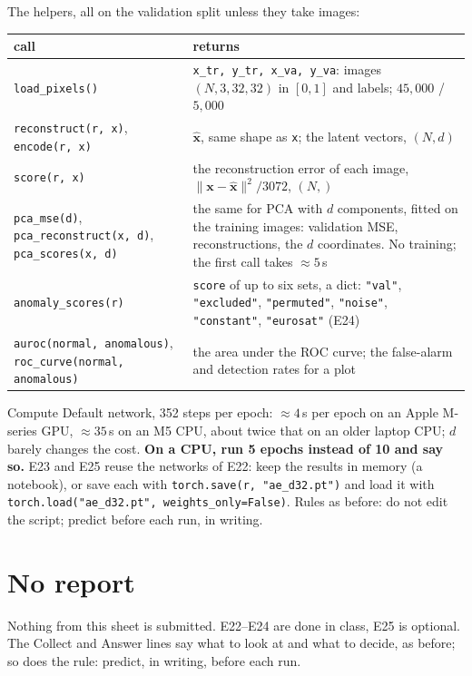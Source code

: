 \documentclass[11pt]{article}
\newcommand{\code}[1]{\texttt{#1}}
\begin{document}
The helpers, all on the validation split unless they take images:
\begin{center}\small
\begin{tabular}{@{}L{5.6cm}L{10.6cm}@{}}
\toprule
call & returns \\
\midrule
\code{load\_pixels()} & \code{x\_tr, y\_tr, x\_va, y\_va}: images $(N,3,32,32)$ in $[0,1]$ and labels; $45{,}000$ / $5{,}000$ \\
\code{reconstruct(r, x)}, \code{encode(r, x)} & $\hat{\mathbf x}$, same shape as \code{x}; the latent vectors, $(N,d)$ \\
\code{score(r, x)} & the reconstruction error of each image, $\|\mathbf x-\hat{\mathbf x}\|^2/3072$, $(N,)$ \\
\code{pca\_mse(d)}, \code{pca\_reconstruct(x, d)}, \code{pca\_scores(x, d)} & the same for PCA with $d$ components, fitted on the training images: validation MSE, reconstructions, the $d$ coordinates. No training; the first call takes $\approx5$\,s \\
\code{anomaly\_scores(r)} & \code{score} of up to six sets, a dict: \code{"val"}, \code{"excluded"}, \code{"permuted"}, \code{"noise"}, \code{"constant"}, \code{"eurosat"} (E24) \\
\code{auroc(normal, anomalous)}, \code{roc\_curve(normal, anomalous)} & the area under the ROC curve; the false-alarm and detection rates for a plot \\
\bottomrule
\end{tabular}
\end{center}

\begin{rules}{Compute}
Default network, 352 steps per epoch: $\approx4$\,s per epoch on an Apple M-series GPU, $\approx35$\,s on an M5 CPU, about twice that on an older laptop CPU; $d$ barely changes the cost. \textbf{On a CPU, run 5 epochs instead of 10 and say so.} E23 and E25 reuse the networks of E22: keep the results in memory (a notebook), or save each with \code{torch.save(r, "ae\_d32.pt")} and load it with \code{torch.load("ae\_d32.pt", weights\_only=False)}. Rules as before: do not edit the script; predict before each run, in writing.
\end{rules}

\section*{No report}
Nothing from this sheet is submitted. E22--E24 are done in class, E25 is optional. The Collect and Answer lines say what to look at and what to decide, as before; so does the rule: predict, in writing, before each run.
\end{document}
